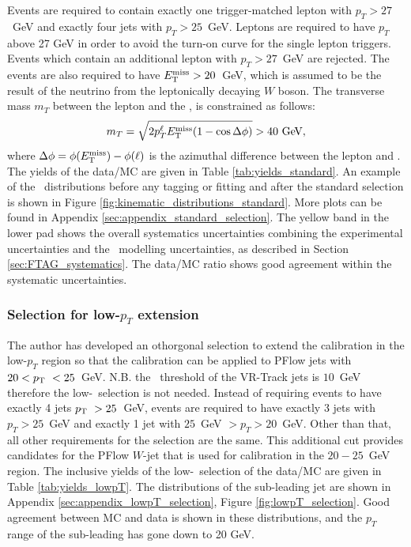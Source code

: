 \documentclass[letterpaper,12pt]{article}
\begin{document}
Events are required to contain exactly one trigger-matched 
lepton with $p_{T} > 27$~GeV and exactly four jets with 
$p_{T} > 25$~GeV. Leptons are required to have $p_{T}$ 
above 27 GeV in order to avoid the turn-on curve for the 
single lepton triggers. Events which contain an additional 
lepton with $p_T > 27$~GeV are rejected. 
The events are also required to have $E_{\mathrm T}^{\mathrm{miss}} > 20$~GeV, which is 
assumed to be the result of the neutrino from the leptonically 
decaying $W$ boson. The transverse
mass $m_T$ between the lepton and the \MET, is
constrained as follows:
\[ m_T = \sqrt{2 p_T^\ell E_{\mathrm T}^{\mathrm{miss}} (1-\cos\Delta\phi)} > 40~\text{Ge\kern -0.1em V},\]
where $\Delta\phi = \phi(E_{\mathrm T}^{\mathrm{miss}})-\phi(\ell)$ is the azimuthal difference between
the lepton and \MET.
The yields of the data/MC are given in Table \ref{tab:yields_standard}.
An example of the \pt\ distributions
before any tagging or fitting and 
after the standard selection is shown in Figure \ref{fig:kinematic_distributions_standard}. 
More plots can be found in Appendix \ref{sec:appendix_standard_selection}.
The yellow band in the lower pad shows the overall systematics uncertainties combining the 
experimental uncertainties and the \ttbar\ modelling uncertainties, as described in 
Section \ref{sec:FTAG_systematics}. The data/MC ratio shows good agreement 
within the systematic uncertainties. 

\subsubsection{Selection for low-$p_T$ extension}
\label{sec:lowpT_selection}
The author has developed an othorgonal selection to 
extend the calibration in the low-$p_{T}$ region so that the calibration 
can be applied to PFlow jets with $20< p_{\mathrm T}\ < 25$~GeV.
N.B. the \pt\ threshold of the VR-Track jets is $10$~GeV 
therefore the low-\pt\ selection is not needed. 
Instead of requiring events to 
have exactly 4 jets $p_{\mathrm T}\ > 25$~GeV, events are required to have exactly 3 jets with $p_{T} > 25$~GeV 
and exactly 1 jet with $25$~GeV $> p_{T} > 20$~GeV. Other than that, 
all other requirements for the selection are the same. 
This additional cut provides candidates for the PFlow $W$-jet that is used 
for calibration in the $20-25$~GeV region. 
The inclusive yields of the low-\pt\ selection 
of the data/MC are given in Table \ref{tab:yields_lowpT}.
The distributions of the sub-leading 
jet are shown in Appendix \ref{sec:appendix_lowpT_selection}, Figure \ref{fig:lowpT_selection}. 
Good agreement between MC and data 
is shown in these distributions, and the $p_{T}$ range of the sub-leading has gone down to 20 GeV. 
\end{document}
